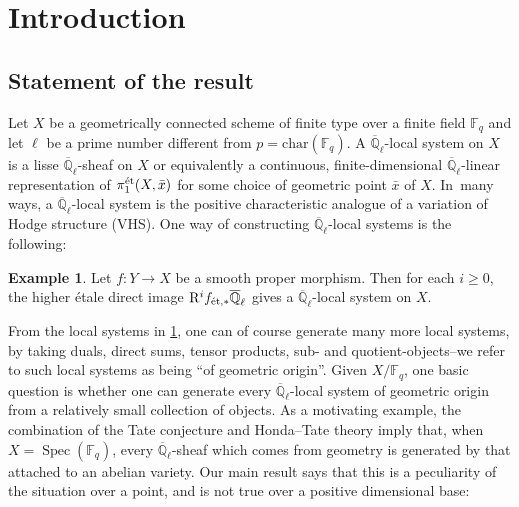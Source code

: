 \documentclass[JEP,XML,SOM,Unicode,published]{cedram}
\numberwithin{equation}{subsection}
\theoremstyle{definition}
\newtheorem{example}[thm]{Example}
\DeclareMathOperator\Spec{Spec}
\newcommand{\Qlbar}{\overline{\mathbb{Q}}_{\ell}}
\newcommand{\Q}{\mathbb Q}
\let\mb\mathbb
\begin{document}
\maketitle
\vspace*{-1.1\baselineskip}
\tableofcontents
\mainmatter

\vspace*{-3.1\baselineskip}\mbox{}
\section{Introduction}

\subsection{Statement of the result}
Let $X$ be a geometrically connected scheme of finite type over a finite field $\mathbb{F}_q$ and let $\ell$ be a prime number different from $p=\mathrm{char}(\mathbb{F}_q)$. A $\overline{\Q}_\ell$-local system on $X$ is a lisse $\overline{\Q}_\ell$-sheaf on $X$ or equivalently a continuous, finite-dimensional $\Qlbar$-linear representation of $\pi^\textnormal{ét}_1(X,\bar x)$ for some choice of geometric point $\bar x$ of $X$. In~many ways, a $\Qlbar$-local system is the positive characteristic analogue of a variation of Hodge structure (VHS). One way of constructing $\overline{\Q}_\ell$-local systems is the following:

\begin{example}\label{ex: geometric-construction-of-local-systems}
Let $f\colon Y\to X$ be a smooth proper morphism. Then for each $i\geq 0$, the higher étale direct image $\mathrm{R}^if_{\textnormal{ét},\ast}\overline{\Q}_\ell$ gives a $\overline{\Q}_\ell$-local system on $X$.
\end{example}

From the local systems in \cref{ex: geometric-construction-of-local-systems}, one can of course generate many more local systems, by taking duals, direct sums, tensor products, sub- and quotient-objects--we refer to such local systems as being \enquote{of geometric origin}. Given $X/\mb{F}_q$, one basic question is whether one can generate every $\Qlbar$-local system of geometric origin from a relatively small collection of objects. As a motivating example, the combination of the Tate conjecture and Honda--Tate theory imply that, when $X=\Spec (\mb{F}_q)$, every $\Qlbar$-sheaf which comes from geometry is generated by that attached to an abelian variety. Our main result says that this is a peculiarity of the situation over a point, and is not true over a positive dimensional base:
\end{document}
